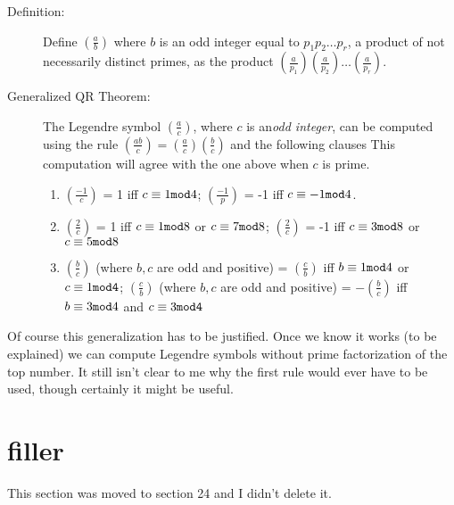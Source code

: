 \documentclass[12pt]{article}
\begin{document}
\begin{description}

\item[Definition:]  Define $\left(\frac ab\right)$ where $b$ is an odd integer equal to $p_1p_2\ldots p_r$, a product of not necessarily distinct primes, as the product  $\left(\frac a{p_1}\right)\left(\frac a{p_2}\right)\ldots\left(\frac a{p_r}\right)$.

\item[Generalized QR Theorem:]   The Legendre symbol $\left(\frac ac\right)$, where $c$ is an{\em  odd integer\/},  can be computed using the rule $\left(\frac{ab}c\right) = \left(\frac ac\right)\left(\frac bc\right)$ and the following clauses
This computation will agree with the one above when $c$ is prime.

\begin{enumerate}

\item  $\left(\frac{-1}c\right)$ = 1 iff $c \equiv1{\tt mod}4$; $\left(\frac{-1}p\right)$ = -1 iff $c \equiv-1{\tt mod}4$.

\item   $\left(\frac{2}c\right)$ = 1 iff $c \equiv 1{\tt mod}8$ or  $c \equiv 7{\tt mod}8$;   $\left(\frac{2}c\right)$ = -1 iff $c \equiv 3{\tt mod}8$ or  $c \equiv 5{\tt mod}8$

\item  $\left(\frac bc\right)$ (where $b,c$ are odd and positive) = $\left(\frac cb\right)$ iff $b \equiv 1{\tt mod}4$ or $c \equiv 1{\tt mod 4}$;    $\left(\frac cb\right)$ (where $b,c$ are odd and positive) = $-\left(\frac bc\right)$ iff $b \equiv 3{\tt mod}4$ and $c \equiv 3{\tt mod 4}$

\end{enumerate}

\end{description}

Of course this generalization has to be justified.   Once we know it works (to be explained) we can compute Legendre symbols without prime factorization of the top number.  It still isn't clear to me why the first rule would ever
have to be used, though certainly it might be useful.  

\section{filler}

This section was moved to section 24 and I didn't delete it.
\end{document}
